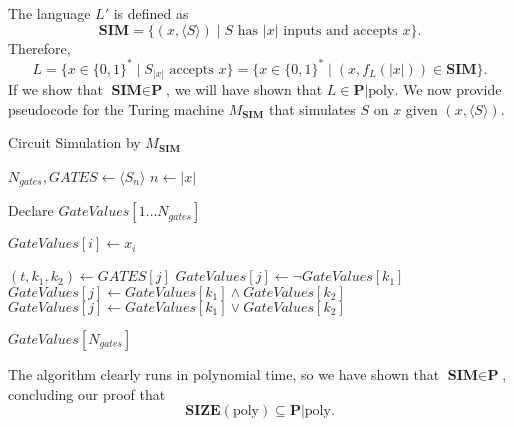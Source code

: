 \documentclass{amsart}
\theoremstyle{plain}
\theoremstyle{definition}
\newcommand{\size}[1]{\textbf{SIZE}(#1)}
\newcommand{\poly}{\text{poly}}
\newcommand{\advice}[2]{#1 | #2}
\newcommand{\p}{\textbf{P}}
\begin{document}
\begin{enumerate}[label=\textbf{Exercise \arabic*:}, leftmargin=0cm, labelwidth=-0.2cm, align=left]
        The language $L'$ is defined as
        \[
            \textbf{SIM}
            = \{ (x, \langle S \rangle) \mid S \text{ has } |x| \text{ inputs and accepts } x\}.
        \]
        Therefore,
        \[
            L = \{ x \in \{0, 1\}^* \mid S_{|x|} \text{ accepts } x \}
            = \{ x \in \{0, 1\}^* \mid (x, f_L(|x|)) \in \textbf{SIM} \}.
        \]
        If we show that $\textbf{SIM} \in \p$, we will have shown that $L \in \advice{\p}{\poly}$.
        We now provide pseudocode for the Turing machine $M_{\textbf{SIM}}$ that simulates $S$ on $x$ given $(x, \langle S \rangle)$.

        \begin{algorithm}[H] %
        \caption{Circuit Simulation by $M_{\textbf{SIM}}$}
        \label{alg:circuitsim_m}
        \begin{algorithmic}[1]
            \State $N_{gates}, GATES \gets \langle S_n \rangle$ 
            \State $n \leftarrow |x|$

            \State Declare $GateValues[1 \dots N_{gates}]$ 

                \State $GateValues[i] \leftarrow x_i$ 
            \EndFor

                \State $(t, k_1, k_2) \gets GATES[j]$ 
                    \State $GateValues[j] \gets \neg GateValues[k_1]$
                    \State $GateValues[j] \gets GateValues[k_1] \land GateValues[k_2]$
                    \State $GateValues[j] \gets GateValues[k_1] \lor GateValues[k_2]$
                \EndIf
            \EndFor

            \State \Return $GateValues[N_{gates}]$
        \EndProcedure
        \end{algorithmic}
        \end{algorithm}

        The algorithm clearly runs in polynomial time,
        so we have shown that $\textbf{SIM} \in \p$, concluding our proof that
        \[
            \size{\poly} \subseteq \advice{\p}{\poly}.
        \]
    \end{enumerate}

    \newpage
    
    
\end{document}
